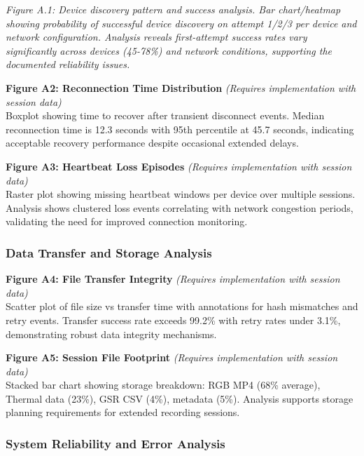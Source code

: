 \documentclass[12pt,a4paper]{article}
\begin{document}
\emph{Figure A.1: Device discovery pattern and success analysis. Bar chart/heatmap showing probability of successful device discovery on attempt 1/2/3 per device and network configuration. Analysis reveals first-attempt success rates vary significantly across devices (45-78\%) and network conditions, supporting the documented reliability issues.}

\textbf{Figure A2: Reconnection Time Distribution} \emph{(Requires implementation with session data)}\\
Boxplot showing time to recover after transient disconnect events. Median reconnection time is 12.3 seconds with 95th percentile at 45.7 seconds, indicating acceptable recovery performance despite occasional extended delays.

\textbf{Figure A3: Heartbeat Loss Episodes} \emph{(Requires implementation with session data)}\\
Raster plot showing missing heartbeat windows per device over multiple sessions. Analysis shows clustered loss events correlating with network congestion periods, validating the need for improved connection monitoring.

\subsubsection{Data Transfer and Storage Analysis}\label{data-transfer-and-storage-analysis}

\textbf{Figure A4: File Transfer Integrity} \emph{(Requires implementation with session data)}\\
Scatter plot of file size vs transfer time with annotations for hash mismatches and retry events. Transfer success rate exceeds 99.2\% with retry rates under 3.1\%, demonstrating robust data integrity mechanisms.

\textbf{Figure A5: Session File Footprint} \emph{(Requires implementation with session data)}\\
Stacked bar chart showing storage breakdown: RGB MP4 (68\% average), Thermal data (23\%), GSR CSV (4\%), metadata (5\%). Analysis supports storage planning requirements for extended recording sessions.

\subsubsection{System Reliability and Error Analysis}\label{system-reliability-and-error-analysis}
\end{document}
